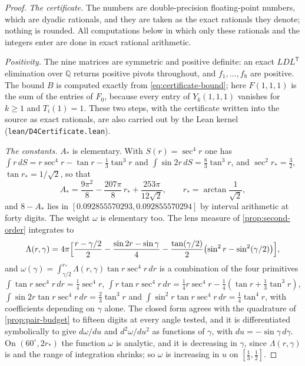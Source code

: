 \documentclass[11pt,reqno]{amsart}
\renewcommand{\_}{\origunderscore\allowbreak}
\numberwithin{equation}{section}
\theoremstyle{plain}
\theoremstyle{definition}
\theoremstyle{remark}
\begin{document}
\begin{proof}
\emph{The certificate.} The numbers are double-precision floating-point
numbers, which are dyadic rationals, and they are taken as the exact
rationals they denote; nothing is rounded. All computations below in
which only these rationals and the integers enter are done in exact
rational arithmetic.

\emph{Positivity.} The nine matrices are symmetric and positive
definite: an exact $LDL^{\mathsf T}$ elimination over $\mathbb Q$ returns
positive pivots throughout, and $f_1,\dots,f_8$ are positive. The
bound $B$ is computed exactly from \eqref{eq:certificate-bound}; here
$F(1,1,1)$ is the sum of the entries of $F_0$, because every entry of
$Y_k(1,1,1)$ vanishes for $k\ge1$ and $T_i(1)=1$. These two steps, with
the certificate written into the source as exact rationals, are also
carried out by the Lean kernel (\texttt{lean/D4Certificate.lean}).

\emph{The constants.} $A_*$ is elementary. With $S(r)=\sec^4r$ one has
$\int r\,dS=r\sec^4r-\tan r-\tfrac13\tan^3r$ and
$\int\sin2r\,dS=\tfrac83\tan^3r$, and $\sec^2r_*=\tfrac32$,
$\tan r_*=1/\sqrt2$, so that
\begin{equation}\label{eq:A-star-closed}
  A_*=\frac{9\pi^2}8-\frac{207\pi}8\,r_*+\frac{253\pi}{12\sqrt2},
  \qquad r_*=\arctan\frac1{\sqrt2},
\end{equation}
and $8-A_*$ lies in $[0.092855570293,0.092855570294]$ by interval
arithmetic at forty digits. The weight $\omega$ is elementary too. The
lens measure of \cref{prop:second-order} integrates to
\[
  \Lambda(r,\gamma)=4\pi\Bigl[\frac{r-\gamma/2}2-\frac{\sin2r-\sin\gamma}4
  -\frac{\tan(\gamma/2)}2\bigl(\sin^2r-\sin^2(\gamma/2)\bigr)\Bigr],
\]
and $\omega(\gamma)=\int_{\gamma/2}^{r_*}\Lambda(r,\gamma)\tan r\sec^4r\,dr$
is a combination of the four primitives
$\int\tan r\sec^4r\,dr=\tfrac14\sec^4r$,
$\int r\tan r\sec^4r\,dr=\tfrac14r\sec^4r-\tfrac14(\tan r+\tfrac13\tan^3r)$,
$\int\sin2r\tan r\sec^4r\,dr=\tfrac23\tan^3r$ and
$\int\sin^2r\tan r\sec^4r\,dr=\tfrac14\tan^4r$, with coefficients
depending on $\gamma$ alone. The closed form agrees with the quadrature
of \cref{prop:pair-budget} to fifteen digits at every angle tested, and
it is differentiated symbolically to give $d\omega/du$ and $d^2\omega/du^2$
as functions of $\gamma$, with $du=-\sin\gamma\,d\gamma$. On
$(60^\circ,2r_*)$ the function $\omega$ is analytic, and it is decreasing
in $\gamma$, since $\Lambda(r,\gamma)$ is and the range of integration
shrinks; so $\omega$ is increasing in $u$ on $[\tfrac13,\tfrac12]$.


\end{proof}
\end{document}
